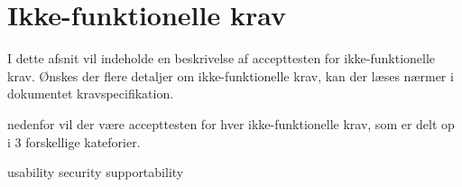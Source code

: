 
\chapter{Ikke-funktionelle krav}

I dette afsnit vil indeholde en beskrivelse af accepttesten for ikke-funktionelle krav. Ønskes der flere detaljer om ikke-funktionelle krav, kan der læses nærmer i dokumentet kravspecifikation.

nedenfor vil der være accepttesten for hver ikke-funktionelle krav, som er delt op i 3 forskellige kateforier.


{usability}
{security}
{supportability}


